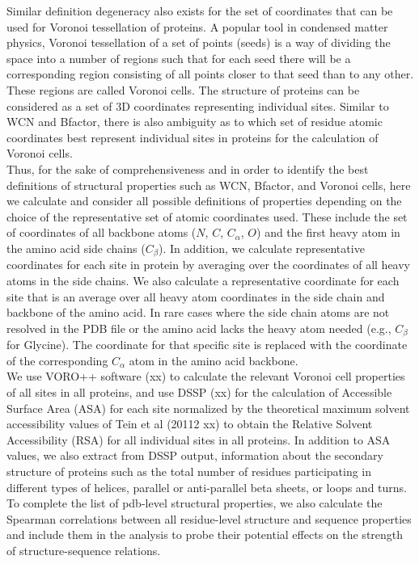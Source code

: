 \documentclass[12pt]{article}
\begin{document}
    Similar definition degeneracy also exists for the set of coordinates that can be used for Voronoi tessellation of proteins. A popular tool in condensed matter physics, Voronoi tessellation of a set of points (seeds) is a way of dividing the space into a number of regions such that for each seed there will be a corresponding region consisting of all points closer to that seed than to any other. These regions are called Voronoi cells. The structure of proteins can be considered as a set of 3D coordinates representing individual sites. Similar to WCN and Bfactor, there is also ambiguity as to which set of residue atomic coordinates best represent individual sites in proteins for the calculation of Voronoi cells.
    \\

    Thus, for the sake of comprehensiveness and in order to identify the best definitions of structural properties such as WCN, Bfactor, and Voronoi cells, here we calculate and consider all possible definitions of properties depending on the choice of the representative set of atomic coordinates used. These include the set of coordinates of all backbone atoms ($N$, $C$, $C_\alpha$, $O$) and the first heavy atom in the amino acid side chains ($C_\beta$). In addition, we calculate representative coordinates for each site in protein by averaging over the coordinates of all heavy atoms in the side chains. We also calculate a representative coordinate for each site that is an average over all heavy atom coordinates in the side chain and backbone of the amino acid. In rare cases where the side chain atoms are not resolved in the PDB file or the amino acid lacks the heavy atom needed (e.g., $C_\beta$ for Glycine). The coordinate for that specific site is replaced with the coordinate of the corresponding $C_\alpha$ atom in the amino acid backbone.
    \\

    We use VORO++ software {\color{red}(xx)} to calculate the relevant Voronoi cell properties of all sites in all proteins, and use DSSP {\color{red}(xx)} for the calculation of Accessible Surface Area (ASA) for each site normalized by the theoretical maximum solvent accessibility values of Tein et al {\color{red}(20112 xx)} to obtain the Relative Solvent Accessibility (RSA) for all individual sites in all proteins. In addition to ASA values, we also extract from DSSP output, information about the secondary structure of proteins such as the total number of residues participating in different types of helices, parallel or anti-parallel beta sheets, or loops and turns. To complete the list of pdb-level structural properties, we also calculate the Spearman correlations between all residue-level structure and sequence properties and include them in the analysis to probe their potential effects on the strength of structure-sequence relations.
    \\
\end{document}
